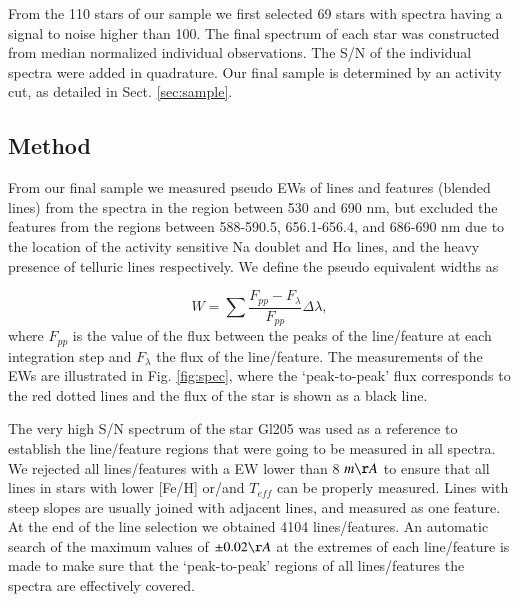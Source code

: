 \documentclass{aa}
\begin{document}




From the 110 stars of our sample we first selected 69 stars with spectra having a signal to noise higher than 100. The final spectrum of each star was constructed from median normalized individual observations. The S/N of the individual spectra were added in quadrature. Our final sample is determined by an activity cut, as detailed in Sect. \ref{sec:sample}.

\subsection{Method}
\label{sec:method}

From our final sample we measured pseudo EWs of lines and features (blended lines) from the spectra in the region between 530 and 690 nm, but excluded the features from the regions between 588-590.5, 656.1-656.4, and 686-690 nm due to the location of the activity sensitive Na doublet and H$\alpha$ lines, and the heavy presence of telluric lines respectively. We define the pseudo equivalent widths as 

\begin{equation}
W = \sum{\frac{F_{pp}-F_{\lambda}}{F_{pp}}\Delta\lambda},
\label{ew}
\end{equation}
where $F_{pp}$ is the value of the flux between the peaks of the line/feature at each integration step and $F_{\lambda}$ the flux of the line/feature. The measurements of the EWs are illustrated in Fig. \ref{fig:spec}, where the `peak-to-peak' flux corresponds to the red dotted lines and the flux of the star is shown as a black line. 

The very high S/N spectrum of the star Gl205 was used as a reference to establish the line/feature regions that were going to be measured in all spectra. We rejected all lines/features with a EW lower than 8 $m\AA$ to ensure that all lines in stars with lower [Fe/H] or/and $T_{eff}$ can be properly measured.  Lines with steep slopes are usually joined with adjacent lines, and measured as one feature. At the end of the line selection we obtained 4104 lines/features. An automatic search of the maximum values of $\pm0.02 \AA$ at the extremes of each line/feature is made to make sure that the `peak-to-peak' regions of all lines/features the spectra are effectively covered. 
\end{document}

